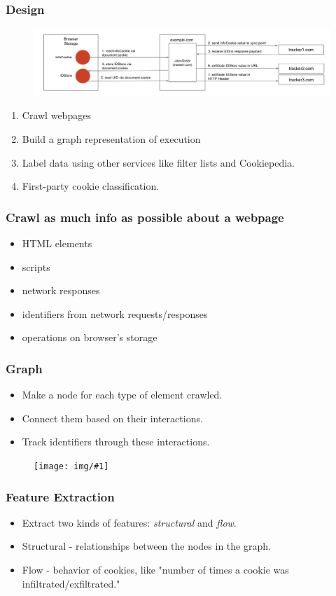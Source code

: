 \documentclass{beamer}
\newcommand{\pic}[1]{
\begin{figure}
\vspace{1cm}
\texttt{[image: img/\#1]}
\end{figure}
}
\begin{document}
\begin{frame}
\frametitle{Design}

\begin{figure}
\includegraphics[scale=0.2]{img/graphconstruction}
\end{figure}

\begin{enumerate}
\item Crawl webpages
\item Build a graph representation of execution
\item Label data using other services like filter lists and Cookiepedia.
\item First-party cookie classification.
\end{enumerate}

\end{frame}

\begin{frame}
\frametitle{Crawl as much info as possible about a webpage}
\begin{itemize}
\item HTML elements
\item scripts
\item network responses
\item identifiers from network requests/responses
\item operations on browser's storage
\end{itemize}
\end{frame}

\begin{frame}
\frametitle{Graph}
\begin{itemize}
\item Make a node for each type of element crawled.
\item Connect them based on their interactions.
\item Track identifiers through these interactions.
\end{itemize}

\pic{grapcon2}

\end{frame}

\begin{frame}
\frametitle{Feature Extraction}
\begin{itemize}
\item Extract two kinds of features: \textit{structural} and \textit{flow}.
\item Structural - relationships between the nodes in the graph.
\item Flow - behavior of cookies, like "number of times a cookie was infiltrated/exfiltrated."
\end{itemize}
\end{frame}
\end{document}
